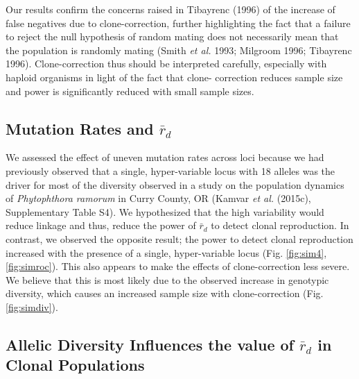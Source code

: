 \documentclass[]{article}
\theoremstyle{definition}
\theoremstyle{definition}
\theoremstyle{remark}
\begin{document}
Our results confirm the concerns raised in Tibayrenc (1996) of the
increase of false negatives due to clone-correction, further
highlighting the fact that a failure to reject the null hypothesis of
random mating does not necessarily mean that the population is randomly
mating (Smith \emph{et al.} 1993; Milgroom 1996; Tibayrenc 1996).
Clone-correction thus should be interpreted carefully, especially with
haploid organisms in light of the fact that clone- correction reduces
sample size and power is significantly reduced with small sample sizes.

\subsection{\texorpdfstring{Mutation Rates and
\(\bar{r}_d\)}{Mutation Rates and \textbackslash{}bar\{r\}\_d}}\label{mutation-rates-and-barr_d}

We assessed the effect of uneven mutation rates across loci because we
had previously observed that a single, hyper-variable locus with 18
alleles was the driver for most of the diversity observed in a study on
the population dynamics of \emph{Phytophthora ramorum} in Curry County,
OR (Kamvar \emph{et al.} (2015c), Supplementary Table S4). We
hypothesized that the high variability would reduce linkage and thus,
reduce the power of \(\bar{r}_d\) to detect clonal reproduction. In
contrast, we observed the opposite result; the power to detect clonal
reproduction increased with the presence of a single, hyper-variable
locus (Fig. \ref{fig:sim4}, \ref{fig:simroc}). This also appears to make
the effects of clone-correction less severe. We believe that this is
most likely due to the observed increase in genotypic diversity, which
causes an increased sample size with clone-correction (Fig.
\ref{fig:simdiv}).

\subsection{\texorpdfstring{Allelic Diversity Influences the value of
\(\bar{r}_d\) in Clonal
Populations}{Allelic Diversity Influences the value of \textbackslash{}bar\{r\}\_d in Clonal Populations}}\label{allelic-diversity-influences-the-value-of-barr_d-in-clonal-populations}
\end{document}

